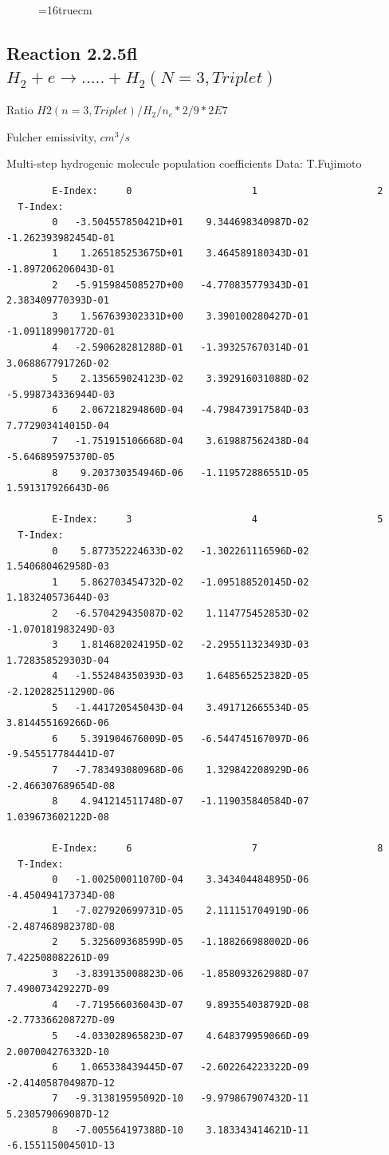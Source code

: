 \documentclass[12pt,dvips]{article}
\begin{document}
\begin{figure} \label{2.2.5e}
\epsfxsize=16truecm
\end{figure}

\newpage
\subsection{
Reaction 2.2.5fl $H_2 + e \rightarrow .....+H_2(N=3,Triplet)$}

Ratio $H2(n=3, Triplet)/H_2/n_e*2/9*2E7 $

 Fulcher emissivity, $cm^3/s$

 Multi-step hydrogenic molecule population coefficients
 Data: T.Fujimoto

\begin{small}\begin{verbatim}
        E-Index:     0                     1                     2
  T-Index:
        0   -3.504557850421D+01    9.344698340987D-02   -1.262393982454D-01
        1    1.265185253675D+01    3.464589180343D-01   -1.897206206043D-01
        2   -5.915984508527D+00   -4.770835779343D-01    2.383409770393D-01
        3    1.567639302331D+00    3.390100280427D-01   -1.091189901772D-01
        4   -2.590628281288D-01   -1.393257670314D-01    3.068867791726D-02
        5    2.135659024123D-02    3.392916031088D-02   -5.998734336944D-03
        6    2.067218294860D-04   -4.798473917584D-03    7.772903414015D-04
        7   -1.751915106668D-04    3.619887562438D-04   -5.646895975370D-05
        8    9.203730354946D-06   -1.119572886551D-05    1.591317926643D-06

        E-Index:     3                     4                     5
  T-Index:
        0    5.877352224633D-02   -1.302261116596D-02    1.540680462958D-03
        1    5.862703454732D-02   -1.095188520145D-02    1.183240573644D-03
        2   -6.570429435087D-02    1.114775452853D-02   -1.070181983249D-03
        3    1.814682024195D-02   -2.295511323493D-03    1.728358529303D-04
        4   -1.552484350393D-03    1.648565252382D-05   -2.120282511290D-06
        5   -1.441720545043D-04    3.491712665534D-05    3.814455169266D-06
        6    5.391904676009D-05   -6.544745167097D-06   -9.545517784441D-07
        7   -7.783493080968D-06    1.329842208929D-06   -2.466307689654D-08
        8    4.941214511748D-07   -1.119035840584D-07    1.039673602122D-08

        E-Index:     6                     7                     8
  T-Index:
        0   -1.002500011070D-04    3.343404484895D-06   -4.450494173734D-08
        1   -7.027920699731D-05    2.111151704919D-06   -2.487468982378D-08
        2    5.325609368599D-05   -1.188266988002D-06    7.422508082261D-09
        3   -3.839135008823D-06   -1.858093262988D-07    7.490073429227D-09
        4   -7.719566036043D-07    9.893554038792D-08   -2.773366208727D-09
        5   -4.033028965823D-07    4.648379959066D-09    2.007004276332D-10
        6    1.065338439445D-07   -2.602264223322D-09   -2.414058704987D-12
        7   -9.313819595092D-10   -9.979867907432D-11    5.230579069087D-12
        8   -7.005564197388D-10    3.183343414621D-11   -6.155115004501D-13


\end{verbatim}
\end{small}
\end{document}
